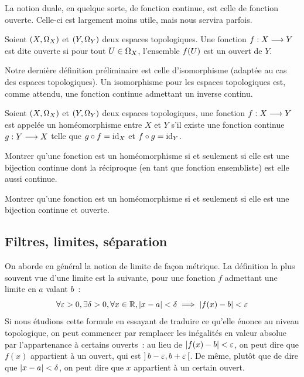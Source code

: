 La notion duale, en quelque sorte, de fonction continue, est celle de fonction
ouverte. Celle-ci est largement moins utile, mais nous servira parfois.

\begin{definition}
  Soient $(X,\Omega_{X})$ et $(Y,\Omega_{Y})$ deux espaces topologiques. Une
  fonction $f : \displaystyle X \longrightarrow Y$ est dite ouverte si pour tout
  $U \in \Omega_{X}$, l'ensemble $f(U)$ est un ouvert de $Y$.
\end{definition}

Notre dernière définition préliminaire est celle d'isomorphisme
(adaptée au cas des espaces topologiques). Un isomorphisme pour les espaces
topologiques est, comme attendu, une fonction continue admettant un inverse
continu.

\begin{definition}[Homéomorphisme]
  Soient $(X,\Omega_{X})$ et $(Y,\Omega_{Y})$ deux espaces topologiques, une
  fonction $f : \displaystyle X \longrightarrow Y$ est appelée un homéomorphisme entre $X$ et
  $Y$ s'il existe une fonction continue $g : \displaystyle Y \longrightarrow X$ telle que
  $g\circ f = \operatorname{id}_X$ et $f\circ g = \operatorname{id}_Y$.
\end{definition}

\begin{exercise}
  Montrer qu'une fonction est un homéomorphisme si et seulement si elle est
  une bijection continue dont la réciproque (en tant que fonction ensembliste)
  est elle aussi continue.
\end{exercise}

\begin{exercise}
  Montrer qu'une fonction est un homéomorphisme si et seulement si elle
  est une bijection continue et ouverte.
\end{exercise}

\subsection{Filtres, limites, séparation}

On aborde en général la notion de limite de façon métrique. La définition la
plus souvent vue d'une limite est la suivante, pour une fonction $f$ admettant
une limite en $a$ valant $b$~:
\[\forall \varepsilon > 0, \exists \delta > 0, \forall x \in \mathbb R,
|x - a| < \delta \implies |f(x) - b| < \varepsilon\]
Si nous étudions cette formule en essayant de traduire ce qu'elle énonce au
niveau topologique, on peut commencer par remplacer les inégalités en valeur
absolue par l'appartenance à certains ouverts~: au lieu de
$|f(x) - b| < \varepsilon$, on peut dire que $f(x)$ appartient à un
ouvert, qui est $\mathord{\left]\,b-\varepsilon,b+\varepsilon\,\right[}$. De même, plutôt que de
dire que $|x - a| < \delta$, on peut dire que $x$ appartient à un certain
ouvert.

